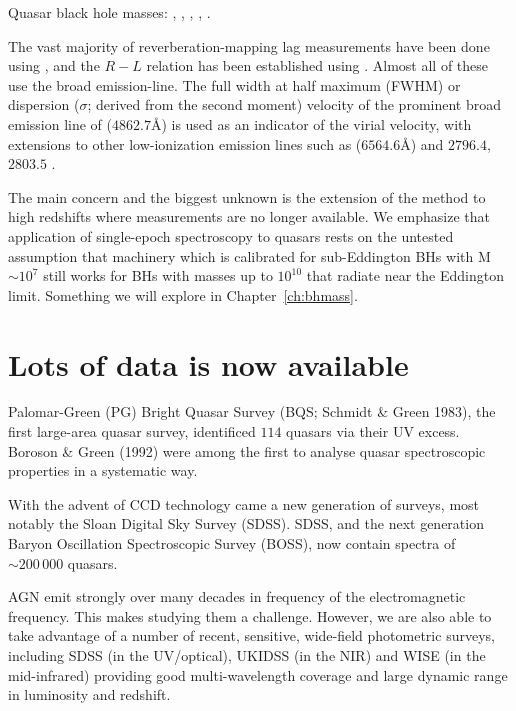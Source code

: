 Quasar black hole masses: \citet{shen13}, \citet{peterson10}, \citet{peterson11}, \citet{vestergaard11}, \citet{marziani12}. 


The vast majority of reverberation-mapping lag measurements have been done using \hbns, and the $R-L$ relation has been established using \hbns. 
Almost all of these use the broad \hb emission-line.
The full width at half maximum (FWHM) or dispersion ($\sigma$; derived from the second moment) velocity of the prominent broad emission line of \hb ($4862.7$\AA) is used as an indicator of the virial velocity, with extensions to other low-ionization emission lines such as \ha ($6564.6$\AA) and \ll$2796.4$,$2803.5$ \citep[e.g.][]{vestergaard02,mclure02,wu04,kollmeier06,onken08,wang09,rafiee11}.

The main concern and the biggest unknown is the extension of the method to high redshifts where \hb measurements are no longer available. 
We emphasize that application of single-epoch spectroscopy to quasars rests on the untested assumption that machinery which is calibrated for sub-Eddington BHs with M$\sim10^7$ still works for BHs with masses up to $10^{10}$ that radiate near the Eddington limit. 
Something we will explore in Chapter~\ref{ch:bhmass}. 


\section{Lots of data is now available}

Palomar-Green (PG) Bright Quasar Survey (BQS; Schmidt \& Green 1983), the first large-area quasar survey, identificed $114$ quasars via their UV excess. 
Boroson \& Green (1992) were among the first to analyse quasar spectroscopic properties in a systematic way.

With the advent of CCD technology came a new generation of surveys, most notably the Sloan Digital Sky Survey (SDSS). 
SDSS, and the next generation Baryon Oscillation Spectroscopic Survey (BOSS), now contain spectra of $\sim200\,000$ quasars. 

AGN emit strongly over many decades in frequency of the electromagnetic frequency. 
This makes studying them a challenge. 
However, we are also able to take advantage of a number of recent, sensitive, wide-field photometric surveys, including SDSS (in the UV/optical), UKIDSS (in the NIR) and WISE (in the mid-infrared) providing good multi-wavelength coverage and large dynamic range in luminosity and redshift.  

